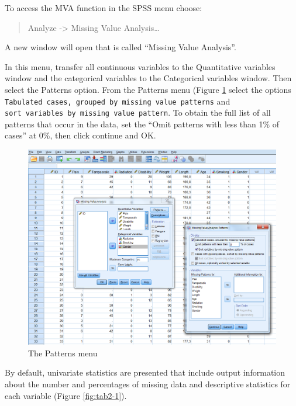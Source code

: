 \documentclass[]{book}
\begin{document}
To access the MVA function in the SPSS menu choose:

\begin{quote}
Analyze -\textgreater{} Missing Value Analysis\ldots{}
\end{quote}

A new window will open that is called ``Missing Value Analysis''.

In this menu, transfer all continuous variables to the Quantitative
variables window and the categorical variables to the Categorical
variables window. Then select the Patterns option. From the Patterns
menu (Figure \ref{fig:fig2-4} select the options
\texttt{Tabulated\ cases,\ grouped\ by\ missing\ value\ patterns} and
\texttt{sort\ variables\ by\ missing\ value\ pattern}. To obtain the
full list of all patterns that occur in the data, set the ``Omit
patterns with less than 1\% of cases'' at 0\%, then click continue and
OK.

\begin{figure}

{\centering \includegraphics[width=0.9\linewidth]{images/fig2.4} 

}

\caption{The Patterns menu}\label{fig:fig2-4}
\end{figure}

By default, univariate statistics are presented that include output
information about the number and percentages of missing data and
descriptive statistics for each variable (Figure \ref{fig:tab2-1}).
\end{document}
